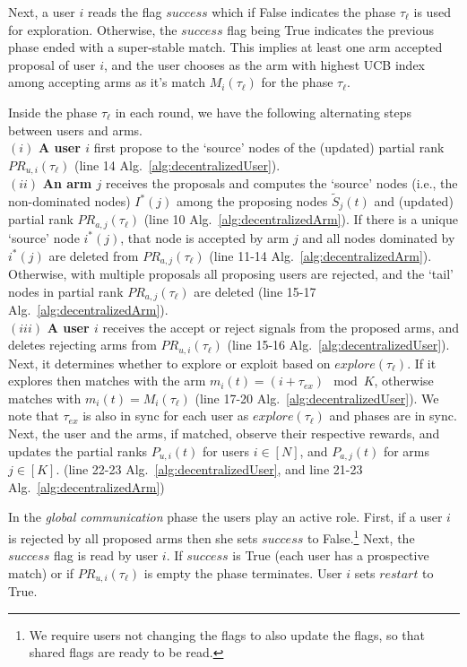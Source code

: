 \documentclass{article}
\begin{document}
Next, a user $i$ reads the flag $success$ which if False indicates the phase $\tau_{\ell}$ is used for exploration.  Otherwise, the $success$ flag being True indicates the previous phase ended with a super-stable match. This implies at least one arm accepted proposal of user $i$, and the user chooses as  the arm with highest UCB index among accepting arms as it's match $M_i(\tau_{\ell})$ for the phase $\tau_{\ell}$.  

Inside the phase $\tau_{\ell}$ in each round, we have the following alternating steps between users and arms.
\\$(i)$\,\,\textbf{A user $i$} first propose to the `source' nodes of the (updated) partial rank $PR_{u,i}(\tau_{\ell})$ (line 14 Alg.~\ref{alg:decentralizedUser}).
\\$(ii)$\,\,\textbf{An arm $j$} receives the proposals and  computes the `source' nodes (i.e., the non-dominated nodes) $I^*(j)$ among the proposing nodes $\tilde{S}_j(t)$ and (updated) partial rank $PR_{a,j}(\tau_{\ell})$ (line 10 Alg.~\ref{alg:decentralizedArm}). If there is a unique `source' node $i^*(j)$, that node is accepted by arm $j$ and all nodes dominated by $i^*(j)$ are deleted from $PR_{a,j}(\tau_{\ell})$ (line 11-14 Alg.~\ref{alg:decentralizedArm}). Otherwise, with multiple proposals all proposing users are rejected, and the `tail' nodes in partial rank $PR_{a,j}(\tau_{\ell})$ are deleted (line 15-17 Alg.~\ref{alg:decentralizedArm}).
\\$(iii)$\,\,\textbf{A user $i$} receives the accept or reject signals from the proposed arms, and deletes rejecting arms from $PR_{u, i}(\tau_{\ell})$ (line 15-16 Alg.~\ref{alg:decentralizedUser}). Next, it determines whether to explore or exploit based on $explore(\tau_{\ell})$. If it explores then matches with the arm $m_i(t) = (i + \tau_{ex}) \mod K$, otherwise matches with $m_i(t) = M_i(\tau_{\ell})$  (line 17-20 Alg.~\ref{alg:decentralizedUser}). We note that $\tau_{ex}$ is also in sync for each user as $explore(\tau_{\ell})$ and phases are in sync. Next, the user and the arms, if matched, observe their respective rewards, and updates the partial ranks $P_{u,i}(t)$ for users $i \in [N]$, and $P_{a, j}(t)$ for arms $j \in [K]$. (line 22-23 Alg.~\ref{alg:decentralizedUser}, and line 21-23 Alg.~\ref{alg:decentralizedArm})

In the \emph{global communication} phase the users play an active role.  First, if a user $i$ is rejected by all proposed arms then she sets $success$ to False.\footnote{We require users not changing the flags to also update the flags, so that shared flags are ready to be read.} Next, the $success$ flag is read by user $i$. If $success$ is True (each user has a prospective match) or if $PR_{u,i}(\tau_{\ell})$ is empty the phase terminates. User $i$ sets $restart$ to True. 
\end{document}
